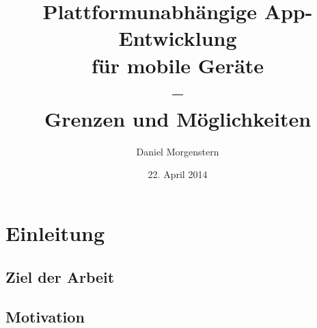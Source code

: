 \documentclass{scrreprt}
\title{Plattformunabhängige App-Entwicklung \\ für mobile Geräte \\--\\ Grenzen und Möglichkeiten}
\author{Daniel Morgenstern}
\date{22. April 2014}
\begin{document}
   \maketitle
   \tableofcontents


\chapter{Einleitung}

\section{Ziel der Arbeit}

\section{Motivation} %

\begin{comment}
Bei der Entwicklung mobiler Anwendungen steht - besonders im Consumer-Bereich - neben vielen anderen Entscheidungen die Wahl der Ziel-Plattform an, wobei ein wichtiger Faktor sicher die Erreichbarkeit einer möglichst großen Nutzer-Anzahl darstellt.
Vermutlich um den  Entwicklungsaufwand nicht ins Bodenlose \todo{Stil!} ausufern zu lassen beschränken sich dabei viele App-Hersteller (oder -anbieter) auf die größten, meist genutzten Plattformen wie Android oder iOS. \todo{darf man so eine Behauptung jetzt einfach machen? oder wie weißt man sowas nach?}

Doch nicht nur, dass dadurch doppelter Wartungs- und Anpassungsaufwand für die Entwicklung entsteht, auch werden dadurch viele andere Betriebssysteme vernachlässigt, was letztlich zu Lasten der Nutzer geht, die auf einem vielfältigen aber auch diffundierten Markt - je nach Hersteller und Plattform - ein zum Teil eingeschränktes und ungleich verteiltes Angebot an Anwendungen vorfinden. 

Auf der anderen Seite hat der Bereich der Webentwicklung und -gestaltung in den letzten Jahren seit Aufkommen von Smartphones und Tablets eine neue Anforderung hinzu bekommen: Websites müssen nicht mehr nur für die unterschiedlichsten Browser auf dem Desktop angepasst werden, sondern sollen sich auch auf Geräten, die für Touch-Bedienung ausgelegt sind unterschiedlicher Bildschirmgrößen gleich gut anfühlen und bedienen lassen. Da der Trend für viele Firmen in Sachen Öffentlichkeitsarbeit, Kundenbindung und -freundlichkeit neben der Firmen-Website und der eigenen Facebook-Seite auch eine eigene App zu fordern scheint, liegt vor dem zuvor genannten Hintergrund der stark variierenden App-Formate der Ansatz nahe, auch den Webbrowser als eine weitere Plattform im bunten Gefüge aus Deployment-Anforderungen zu sehen, die nach Verminderung und Zusammenführung des Entwicklungsaufwands im mobilen Bereich verlangt. 

Letzterer Ansatz ist allerdings nur einer, den es zu Untersuchen gilt; Zentraler Forschungsgegenstand soll die Exploration der Möglichkeiten und Grenzen der plattformunabhängigen App-Entwicklung anhand eines beispielhaft implementierten Anwendungsfalls sein.
\end{comment}
\end{document}
